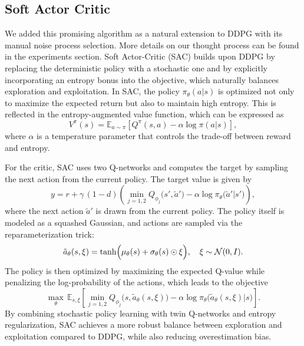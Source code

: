\subsection{Soft Actor Critic}
We added this promising algorithm as a natural extension to DDPG with its manual noise process selection. More details on our thought process can be found in the experiments section. Soft Actor-Critic (SAC) builds upon DDPG by replacing the deterministic policy with a stochastic one and by explicitly incorporating an entropy bonus into the objective, which naturally balances exploration and exploitation\cite{HaarnojaAbbeelLevine2018:SAC}. In SAC, the policy \(\pi_\theta(a|s)\) is optimized not only to maximize the expected return but also to maintain high entropy. This is reflected in the entropy-augmented value function, which can be expressed as
\[
V^{\pi}(s) = \mathbb{E}_{a\sim\pi}\!\left[Q^{\pi}(s,a)-\alpha\log\pi(a|s)\right],
\]
where \(\alpha\) is a temperature parameter that controls the trade-off between reward and entropy.

For the critic, SAC uses two Q-networks and computes the target by sampling the next action from the current policy. The target value is given by
\[
y = r + \gamma\,(1-d)\left(\min_{j=1,2}Q_{\phi_j}\bigl(s',\tilde{a}'\bigr)-\alpha\log\pi_\theta\bigl(\tilde{a}'|s'\bigr)\right),
\]
where the next action \(\tilde{a}'\) is drawn from the current policy. The policy itself is modeled as a squashed Gaussian, and actions are sampled via the reparameterization trick:
\[
\tilde{a}_\theta(s,\xi)=\tanh\Bigl(\mu_\theta(s)+\sigma_\theta(s)\odot\xi\Bigr),\quad \xi\sim\mathcal{N}(0,I).
\]
The policy is then optimized by maximizing the expected Q-value while penalizing the log-probability of the actions, which leads to the objective
\[
\max_\theta\,\mathbb{E}_{s,\xi}\!\left[\min_{j=1,2}Q_{\phi_j}\bigl(s,\tilde{a}_\theta(s,\xi)\bigr)-\alpha\log\pi_\theta\bigl(\tilde{a}_\theta(s,\xi)|s\bigr)\right].
\]
By combining stochastic policy learning with twin Q-networks and entropy regularization, SAC achieves a more robust balance between exploration and exploitation compared to DDPG, while also reducing overestimation bias.

